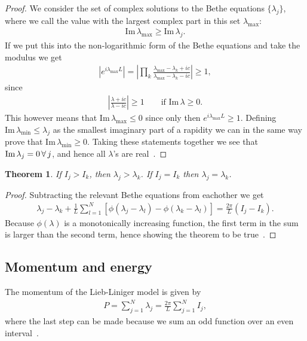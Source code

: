\documentclass[11pt, a4paper]{report} %
\newtheorem{theorem}{Theorem}
\begin{document}
\begin{proof}
We consider the set of complex solutions to the Bethe equations \(\{\lambda_j\}\), where we call the value with the largest complex part in this set \(\lambda_{\max}\):
\begin{align}
\textrm{Im} \, \lambda_{\max} \geq \textrm{Im} \, \lambda_j.
\end{align}
If we put this into the non-logarithmic form of the Bethe equations and take the modulus we get
\begin{align}
  \left| e^{i\lambda_{\max} L} \right|= \left| \prod_k \frac{\lambda_{\max} - \lambda_k + ic}{\lambda_{\max} - \lambda_k - ic} \right|\geq 1,
\end{align}
since
\begin{align}
\left|\frac{\lambda+ic}{\lambda-ic} \right| \geq 1 \qquad \textrm{if Im}\, \lambda \geq 0.
\end{align}
This however means that \(\textrm{Im}\, \lambda_{\max} \leq 0\) since only then \(e^{i\lambda_{\max}L} \geq 1\).
Defining \(\textrm{Im}\,\lambda_{\min}\leq \lambda_j\) as the smallest imaginary part of a rapidity we can in the same way prove that \(\textrm{Im}\,\lambda_{\min} \geq 0\).
Taking these statements together we see that \(\textrm{Im}\, \lambda_{j}=0\textrm{\,}\forall\textrm{\,} j\), and hence all  \(\lambda\)'s are real~\cite{Korepin1993}.
\end{proof}

\begin{theorem}
If \(I_j >I_k\), then \(\lambda_j > \lambda_k\). If \(I_j=I_k\) then \(\lambda_j=\lambda_k\).
\end{theorem}

\begin{proof}
Subtracting the relevant Bethe equations from eachother we get
\begin{align}
  \lambda_j - \lambda_k + \frac{1}{L}\sum_{l=1}^N \left[\phi(\lambda_j - \lambda_l) - \phi(\lambda_k - \lambda_l)\right] = \frac{2\pi}{L} (I_j - I_k).
\end{align}
Because \(\phi(\lambda)\) is a monotonically increasing function, the first term in the sum is larger than the second term, hence showing the theorem to be true~\cite{Korepin1993}.
\end{proof}

\subsection{Momentum and energy}
The momentum of the Lieb-Liniger model is given by
\begin{align}
  P = \sum_{j=1}^N \lambda_j = \frac{2\pi}{L}\sum_{j=1}^N I_j,
\end{align}
where the last step can be made because we sum an odd function over an even interval~\cite{Korepin1993}.
\end{document}
